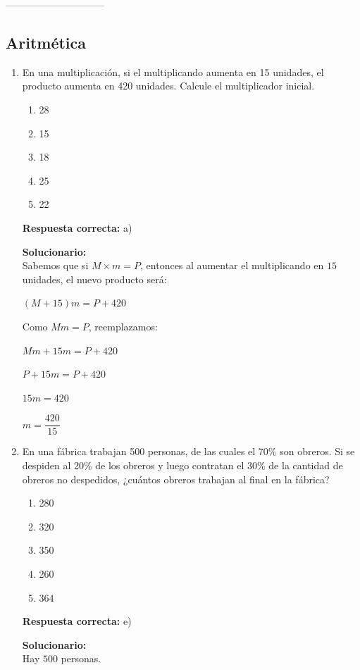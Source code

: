 ------------------------------


\subsection*{Aritmética}

\begin{enumerate}
	
	\item En una multiplicación, si el multiplicando aumenta en 15 unidades, el producto aumenta en 420 unidades. Calcule el multiplicador inicial.
	\begin{enumerate}[label=\alph*)]
		\item 28
		\item 15
		\item 18
		\item 25
		\item 22
	\end{enumerate}
	\textbf{Respuesta correcta:} a)
	
	\vspace{2mm}
	\textbf{Solucionario:}\\

	Sabemos que si $M\times m=P$, entonces al aumentar el multiplicando en $15$ unidades, el nuevo producto será:
	
	$(M+15)m=P+420$
	
	Como $Mm=P$, reemplazamos:
	
	$Mm+15m=P+420$
	
	$P+15m=P+420$
	
	$15m=420$
	
	$m=\dfrac{420}{15}$
	
	\vspace{6mm}
	
	\item En una fábrica trabajan 500 personas, de las cuales el 70\% son obreros. Si se despiden al 20\% de los obreros y luego contratan el 30\% de la cantidad de obreros no despedidos, ¿cuántos obreros trabajan al final en la fábrica?
	\begin{enumerate}[label=\alph*)]
		\item 280
		\item 320
		\item 350
		\item 260
		\item 364
	\end{enumerate}
	\textbf{Respuesta correcta:} e)
	
	\vspace{2mm}
	\textbf{Solucionario:}\\
	Hay $500$ personas.
	

\end{enumerate}
